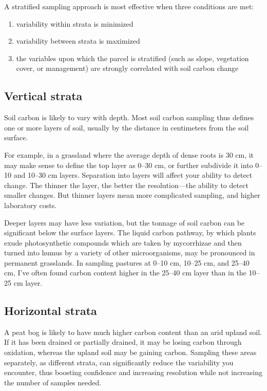 \documentclass[11pt,letterpaper,oneside,onecolumn]{memoir}
\begin{document}
A stratified sampling approach is most effective when three conditions are met:
\begin{enumerate}
\item variability within strata is minimized
\item variability between strata is maximized
\item the variables upon which the parcel is stratified (such as slope, vegetation cover, or management) are strongly correlated with soil carbon change
\end{enumerate}

\subsection{Vertical strata}

Soil carbon is likely to vary with depth. Most soil carbon sampling thus defines one or more layers of soil, usually by the distance in centimeters from the soil surface.

For example, in a grassland where the average depth of dense roots is 30 cm, it may make sense to define the top layer as 0--30 cm, or further subdivide it into 0--10 and 10--30 cm layers. Separation into layers will affect your ability to detect change. The thinner the layer, the better the resolution---the ability to detect smaller changes. But thinner layers mean more complicated sampling, and higher laboratory costs.

Deeper layers may have less variation, but the tonnage of soil carbon can be significant below the surface layers. The liquid carbon pathway, by which plants exude photosynthetic compounds which are taken by mycorrhizae and then turned into humus by a variety of other microorganisms, may be pronounced in permanent grasslands. In sampling pastures at 0--10 cm, 10--25 cm, and 25--40 cm, I've often found carbon content higher in the 25--40 cm layer than in the 10--25 cm layer.

\subsection{Horizontal strata}

A peat bog is likely to have much higher carbon content than an arid upland soil. If it has been drained or partially drained, it may be losing carbon through oxidation, whereas the upland soil may be gaining carbon. Sampling these areas separately, as different strata, can significantly reduce the variability you encounter, thus boosting confidence and increasing resolution while not increasing the number of samples needed.
\end{document}
